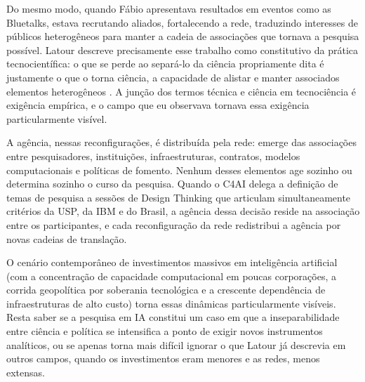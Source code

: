 Do mesmo modo, quando Fábio apresentava resultados em eventos como as Bluetalks, estava recrutando aliados, fortalecendo a rede, traduzindo interesses de públicos heterogêneos para manter a cadeia de associações que tornava a pesquisa possível. Latour descreve precisamente esse trabalho como constitutivo da prática tecnocientífica: o que se perde ao separá-lo da ciência propriamente dita é justamente o que o torna ciência, a capacidade de alistar e manter associados elementos heterogêneos \parencite{Latour2011CienciaEmAcao}. A junção dos termos técnica e ciência em tecnociência é exigência empírica, e o campo que eu observava tornava essa exigência particularmente visível.

A agência, nessas reconfigurações, é distribuída pela rede: emerge das associações entre pesquisadores, instituições, infraestruturas, contratos, modelos computacionais e políticas de fomento. Nenhum desses elementos age sozinho ou determina sozinho o curso da pesquisa. Quando o C4AI delega a definição de temas de pesquisa a sessões de Design Thinking que articulam simultaneamente critérios da USP, da IBM e do Brasil, a agência dessa decisão reside na associação entre os participantes, e cada reconfiguração da rede redistribui a agência por novas cadeias de translação.

O cenário contemporâneo de investimentos massivos em inteligência artificial (com a concentração de capacidade computacional em poucas corporações, a corrida geopolítica por soberania tecnológica e a crescente dependência de infraestruturas de alto custo) torna essas dinâmicas particularmente visíveis. Resta saber se a pesquisa em IA constitui um caso em que a inseparabilidade entre ciência e política se intensifica a ponto de exigir novos instrumentos analíticos, ou se apenas torna mais difícil ignorar o que Latour já descrevia em outros campos, quando os investimentos eram menores e as redes, menos extensas.